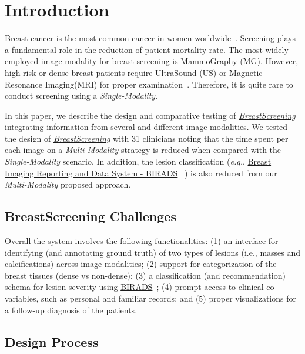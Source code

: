 \section{Introduction}
\label{sec:sec001}

Breast cancer is the most common cancer in women worldwide~\cite{henriksen2018efficacy}.
Screening plays a fundamental role in the reduction of patient mortality rate.
The most widely employed image modality for breast screening is MammoGraphy (MG).
However, high-risk or dense breast patients require UltraSound (US) or Magnetic Resonance Imaging\footnotemark[1] (MRI) for proper examination~\cite{Maicas2019}.
Therefore, it is quite rare to conduct screening using a \textit{Single-Modality}.

In this paper, we describe the design and comparative testing of \href{https://breastscreening.github.io/}{{\it BreastScreening}} integrating information from several and different image modalities.
We tested the design of \href{https://breastscreening.github.io/}{{\it BreastScreening}} with 31 clinicians noting that the time spent per each image on a \textit{Multi-Modality} strategy is reduced when compared with the \textit{Single-Modality} scenario.
In addition, the lesion classification ({\em e.g.}, \href{https://breast-cancer.ca/bi-rads/}{Breast Imaging Reporting and Data System - BIRADS} ~\cite{SPAK2017179}) is also reduced from our \textit{Multi-Modality} proposed approach.

\subsection{BreastScreening Challenges}

Overall the system involves the  following functionalities:
(1) an interface for identifying (and annotating ground truth) of two types of lesions (i.e., masses and calcifications) across image modalities;
(2) support for categorization of the breast tissues (dense vs non-dense);
(3) a classification (and recommendation) schema for lesion severity using \href{https://breast-cancer.ca/bi-rads/}{BIRADS}~\cite{aghaei2018association, SPAK2017179};
(4) prompt access to clinical co-variables, such as personal and familiar records; and
(5) proper visualizations for a follow-up diagnosis of the patients.

\subsection{Design Process}

